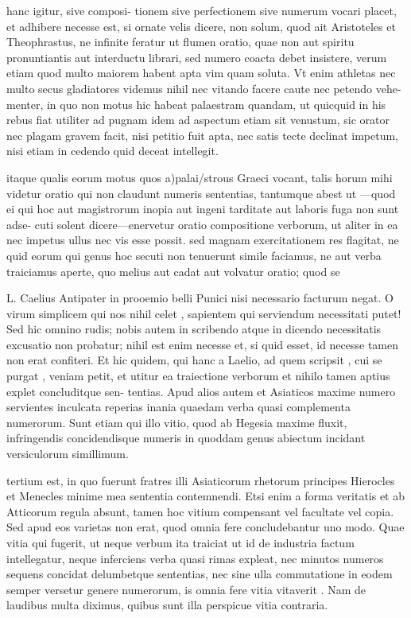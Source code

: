  hanc igitur, sive composi- tionem sive perfectionem sive numerum vocari placet, et adhibere necesse est, si ornate velis dicere, non solum, quod ait Aristoteles et Theophrastus, ne infinite feratur ut flumen oratio, quae non aut spiritu pronuntiantis aut interductu librari, sed numero coacta debet insistere, verum etiam quod multo maiorem habent apta vim quam soluta. Vt enim athletas nec multo secus gladiatores videmus nihil nec vitando facere caute nec petendo vehe- menter, in quo non motus hic habeat palaestram quandam, ut quicquid in his rebus fiat utiliter ad pugnam idem ad aspectum etiam sit venustum, sic orator nec plagam gravem facit, nisi petitio fuit apta, nec satis tecte declinat impetum, nisi etiam in cedendo quid deceat intellegit.

 itaque qualis eorum motus quos a)palai/strous Graeci vocant, talis horum mihi videtur oratio qui non claudunt numeris sententias, tantumque abest ut —quod ei qui hoc aut magistrorum inopia aut ingeni tarditate aut laboris fuga non sunt adse- cuti solent dicere—enervetur oratio compositione verborum, ut aliter in ea nec impetus ullus nec vis esse possit. sed magnam exercitationem res flagitat, ne quid eorum qui genus hoc secuti non tenuerunt simile faciamus, ne aut verba traiciamus aperte, quo melius aut cadat aut volvatur oratio; quod se

 L. Caelius Antipater in prooemio belli Punici nisi necessario facturum negat. O virum simplicem qui nos nihil celet , sapientem qui serviendum necessitati putet! Sed hic omnino rudis; nobis autem in scribendo atque in dicendo necessitatis excusatio non probatur; nihil est enim necesse et, si quid esset, id necesse tamen non erat confiteri. Et hic quidem, qui hanc a Laelio, ad quem scripsit , cui se purgat , veniam petit, et utitur ea traiectione verborum et nihilo tamen aptius explet concluditque sen- tentias. Apud alios autem et Asiaticos maxime numero servientes inculcata reperias inania quaedam verba quasi complementa numerorum. Sunt etiam qui illo vitio, quod ab Hegesia maxime fluxit, infringendis concidendisque numeris in quoddam genus abiectum incidant versiculorum simillimum.

 tertium est, in quo fuerunt fratres illi Asiaticorum rhetorum principes Hierocles et Menecles minime mea sententia contemnendi. Etsi enim a forma veritatis et ab Atticorum regula absunt, tamen hoc vitium compensant vel facultate vel copia. Sed apud eos varietas non erat, quod omnia fere concludebantur uno modo. Quae vitia qui fugerit, ut neque verbum ita traiciat ut id de industria factum intellegatur, neque inferciens verba quasi rimas expleat, nec minutos numeros sequens concidat delumbetque sententias, nec sine ulla commutatione in eodem semper versetur genere numerorum, is omnia fere vitia vitaverit . Nam de laudibus multa diximus, quibus sunt illa perspicue vitia contraria.

